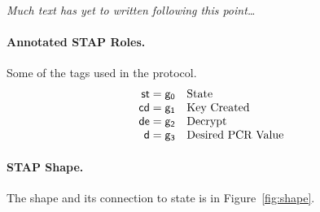 \documentclass[12pt]{article}
\newcommand{\cn}[1]{\ensuremath{\operatorname{\mathsf{#1}}}}
\begin{document}
\emph{Much text has yet to written following this point\ldots}

\paragraph{Annotated STAP Roles.}

Some of the tags used in the protocol.
$$\begin{array}{r@{{}={}}ll}
\cn{st}&\cn{g_0}&\mbox{State}\\
\cn{cd}&\cn{g_1}&\mbox{Key Created}\\
\cn{de}&\cn{g_2}&\mbox{Decrypt}\\
\cn{d}&\cn{g_3}&\mbox{Desired PCR Value}
\end{array}$$

\paragraph{STAP Shape.}

The shape and its connection to state is in Figure~\ref{fig:shape}.
\end{document}

